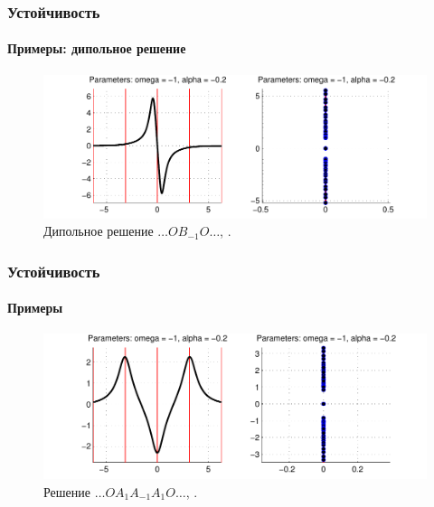 \documentclass{beamer}
\begin{document}
\begin{frame}
	\frametitle{Устойчивость}
	\framesubtitle{Примеры: дипольное решение\footnotemark[5]}
	
	\begin{figure}
		\includegraphics[width=1\textwidth]{pic/example_2.pdf}
		\caption{Дипольное решение $\dots O B_{-1} O \dots$, {\it \color{forestgreen}{линейно устойчиво}}.}
		\label{pic:example_2}
	\end{figure}
	
\end{frame}

\begin{frame}
	\frametitle{Устойчивость}
	\framesubtitle{Примеры}
	
	\begin{figure}
		\includegraphics[width=1\textwidth]{pic/example_3.pdf}
		\caption{Решение $\dots O A_1 A_{-1} A_1 O \dots$, {\it \color{forestgreen}{линейно устойчиво}}.}
		\label{pic:example_3}
	\end{figure}
\end{frame}
\end{document}

